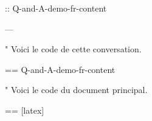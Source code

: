 \documentclass[%
  numbered question,
  numbered answer,
  scroll,
]{Q-and-A}
\begin{document}
:: {Q-and-A-demo-fr-content}


---

"
  Voici le code de cette conversation.

  == {Q-and-A-demo-fr-content}

"
  Voici le code du document principal.

  == [latex] {\jobname}
\end{document}
